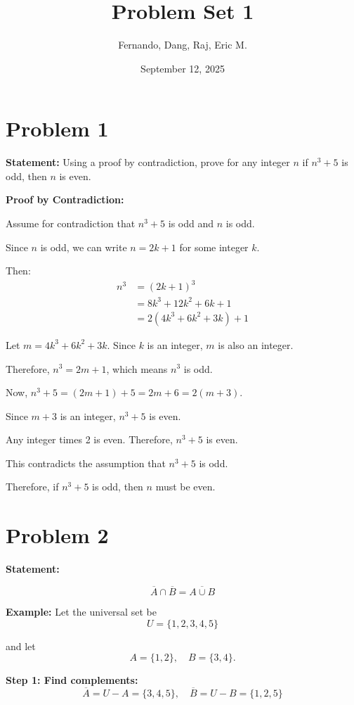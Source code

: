 \documentclass{article}
\title{Problem Set 1}
\author{Fernando, Dang, Raj, Eric M.}
\date{September 12, 2025}
\begin{document}
\maketitle

\section*{Problem 1}

\textbf{Statement:} Using a proof by contradiction, prove for any integer $n$ if $n^3 + 5$ is odd, then $n$ is even.

\textbf{Proof by Contradiction:}

Assume for contradiction that $n^3 + 5$ is odd and $n$ is odd.

Since $n$ is odd, we can write $n = 2k + 1$ for some integer $k$.

Then:
\begin{align}
n^3 &= (2k + 1)^3\\
&= 8k^3 + 12k^2 + 6k + 1\\
&= 2(4k^3 + 6k^2 + 3k) + 1
\end{align}

Let $m = 4k^3 + 6k^2 + 3k$. Since $k$ is an integer, $m$ is also an integer.

Therefore, $n^3 = 2m + 1$, which means $n^3$ is odd.

Now, $n^3 + 5 = (2m + 1) + 5 = 2m + 6 = 2(m + 3)$.

Since $m + 3$ is an integer, $n^3 + 5$ is even.

Any integer times 2 is even. Therefore, $n^3 + 5$ is even.

This contradicts the assumption that $n^3 + 5$ is odd.

Therefore, if $n^3 + 5$ is odd, then $n$ must be even.

\section*{Problem 2}

\textbf{Statement:} 

\[
\overline{A} \cap \overline{B} = \overline{A \cup B}
\]

\textbf{Example:} Let the universal set be 
\[
U = \{1,2,3,4,5\}
\] 

and let 
\[
A = \{1,2\}, \quad B = \{3,4\}.
\]

\textbf{Step 1: Find complements:}
\[
\overline{A} = U - A = \{3,4,5\}, \quad \overline{B} = U - B = \{1,2,5\}
\]
\end{document}
